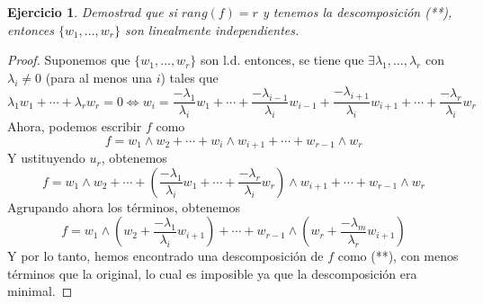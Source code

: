 \documentclass[12pt]{article}
\theoremstyle{break}
\newtheorem{ej}{Ejercicio}
\newtheorem*{proof}{Demostración}
\begin{document}
\begin{ej}
	Demostrad que si $rang(f)=r$ y tenemos la descomposición (**), entonces
	$\{ w_1, \dots, w_r\}$ son linealmente independientes.
\end{ej}
\begin{proof}
	Suponemos que $\{w_1,\dots, w_r\}$ son l.d. entonces, se tiene que 
	$\exists \lambda_1,\dots,\lambda_r$ con $\lambda_i \neq 0$ (para al menos una $i$) tales que
	\[
	\lambda_1 w_1 + \cdots + \lambda_r w_r = 0 \iff
	w_i = \frac{-\lambda_1}{\lambda_i} w_1+\cdots + \frac{-\lambda_{i-1}}{\lambda_i} w_{i-1}+
	\frac{-\lambda_{i+1}}{\lambda_i} w_{i+1} + \cdots  + \frac{-\lambda_r}{\lambda_i} w_r
	\]
	Ahora, podemos escribir $f$ como
	\[
	f = w_1 \wedge w_2 + \cdots + w_i \wedge w_{i+1} + \cdots + w_{r-1} \wedge w_r
	\]
	Y ustituyendo $u_r$, obtenemos
	\[
	f = w_1 \wedge w_2 + \cdots + \left( \frac{-\lambda_1}{\lambda_i} w_1 + \cdots +
	\frac{-\lambda_r}{\lambda_i} w_r \right) \wedge w_{i+1} + \cdots + w_{r-1} \wedge w_r
	\]
	Agrupando ahora los términos, obtenemos
	\[
	f = w_1 \wedge \left( w_2 + \frac{-\lambda_1}{\lambda_i} w_{i+1} \right) + \cdots +
	w_{r-1} \wedge \left( w_r + \frac{-\lambda_m}{\lambda_r} w_{i+1} \right)
	\]
	Y por lo tanto, hemos encontrado una descomposición de $f$ como (**), con menos términos
	que la original, lo cual es imposible ya que la descomposición era minimal.
\end{proof}
\end{document}
